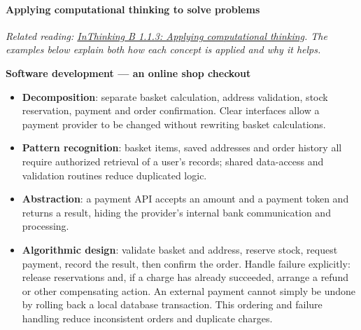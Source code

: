 \documentclass[a4paper,12pt]{article}
\begin{document}
\paragraph{Applying computational thinking to solve problems}
\noindent\textit{Related reading: \href{https://thinkib.net/computerscience/page/58832/b-113-applying-computational-thinking}{InThinking B 1.1.3: Applying computational thinking}. The examples below explain both how each concept is applied and why it helps.}

\textbf{Software development --- an online shop checkout}
\begin{itemize}
    \item \textbf{Decomposition}: separate basket calculation, address validation, stock reservation, payment and order confirmation. Clear interfaces allow a payment provider to be changed without rewriting basket calculations.
    \item \textbf{Pattern recognition}: basket items, saved addresses and order history all require authorized retrieval of a user's records; shared data-access and validation routines reduce duplicated logic.
    \item \textbf{Abstraction}: a payment API accepts an amount and a payment token and returns a result, hiding the provider's internal bank communication and processing.
    \item \textbf{Algorithmic design}: validate basket and address, reserve stock, request payment, record the result, then confirm the order. Handle failure explicitly: release reservations and, if a charge has already succeeded, arrange a refund or other compensating action. An external payment cannot simply be undone by rolling back a local database transaction. This ordering and failure handling reduce inconsistent orders and duplicate charges.
\end{itemize}
\end{document}
